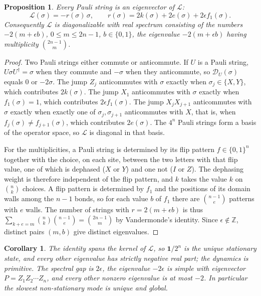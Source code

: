 \documentclass[11pt,a4paper]{article}
\newtheorem{proposition}[theorem]{Proposition}
\newtheorem{corollary}[theorem]{Corollary}
\theoremstyle{definition}
\theoremstyle{plain}
\newcommand{\one}{\mathbf{1}}
\newcommand{\cL}{\mathcal{L}}
\newcommand{\cD}{\mathcal{D}}
\begin{document}
\begin{proposition}\label{prop:spectrum}
Every Pauli string is an eigenvector of $\cL$:
\[
\cL(\sigma)=-r(\sigma)\,\sigma,\qquad
r(\sigma)=2k(\sigma)+2e(\sigma)+2\epsilon f_1(\sigma).
\]
Consequently $\cL$ is diagonalizable with real spectrum consisting of the
numbers $-2(m+\epsilon b)$, $0\le m\le 2n-1$, $b\in\{0,1\}$, the eigenvalue
$-2(m+\epsilon b)$ having multiplicity $\binom{2n-1}{m}$.
\end{proposition}

\begin{proof}
Two Pauli strings either commute or anticommute. If $U$ is a Pauli string,
$U\sigma U^\dagger=\sigma$ when they commute and $-\sigma$ when they
anticommute, so $\cD_U(\sigma)$ equals $0$ or $-2\sigma$. The jump $Z_j$
anticommutes with $\sigma$ exactly when $\sigma_j\in\{X,Y\}$, which
contributes $2k(\sigma)$. The jump $X_1$ anticommutes with $\sigma$ exactly
when $f_1(\sigma)=1$, which contributes $2\epsilon f_1(\sigma)$. The jump
$X_jX_{j+1}$ anticommutes with $\sigma$ exactly when exactly one of
$\sigma_j,\sigma_{j+1}$ anticommutes with $X$, that is, when
$f_j(\sigma)\ne f_{j+1}(\sigma)$, which contributes $2e(\sigma)$. The $4^n$
Pauli strings form a basis of the operator space, so $\cL$ is diagonal in
that basis.

For the multiplicities, a Pauli string is determined by its flip pattern
$f\in\{0,1\}^n$ together with the choice, on each site, between the two
letters with that flip value, one of which is dephased ($X$ or $Y$) and one
not ($I$ or $Z$). The dephasing weight is therefore independent of the flip
pattern, and $k$ takes the value $k$ on $\binom nk$ choices. A flip pattern
is determined by $f_1$ and the positions of its domain walls among the $n-1$
bonds, so for each value $b$ of $f_1$ there are $\binom{n-1}{e}$ patterns
with $e$ walls. The number of strings with $r=2(m+\epsilon b)$ is thus
$\sum_{k+e=m}\binom nk\binom{n-1}{e}=\binom{2n-1}{m}$ by Vandermonde's
identity. Since $\epsilon\notin\mathbb Z$, distinct pairs $(m,b)$ give
distinct eigenvalues.
\end{proof}

\begin{corollary}\label{cor:slow}
The identity spans the kernel of $\cL$, so $\one/2^n$ is the unique
stationary state, and every other eigenvalue has strictly negative real
part; the dynamics is primitive. The spectral gap is $2\epsilon$, the
eigenvalue $-2\epsilon$ is simple with eigenvector $P=Z_1Z_2\cdots Z_n$, and
every other nonzero eigenvalue is at most $-2$. In particular the slowest
non-stationary mode is unique and global.
\end{corollary}
\end{document}

